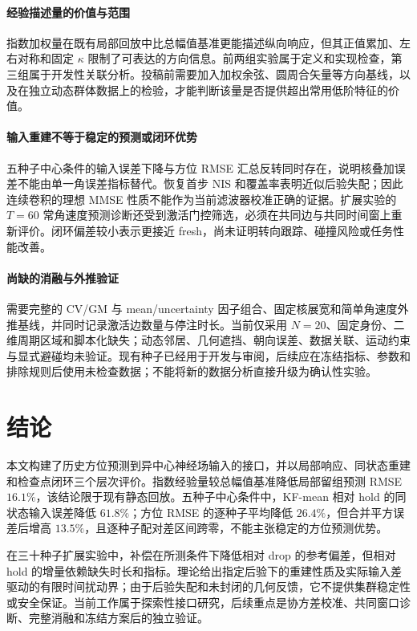 \documentclass[UTF8,fontset=windows,11pt]{ctexart}
\begin{document}
\paragraph{经验描述量的价值与范围}
指数加权量在既有局部回放中比总幅值基准更能描述纵向响应，但其正值累加、左右对称和固定 $\kappa$ 限制了可表达的方向信息。前两组实验属于定义和实现检查，第三组属于开发性关联分析。投稿前需要加入加权余弦、圆周合矢量等方向基线，以及在独立动态群体数据上的检验，才能判断该量是否提供超出常用低阶特征的价值。

\paragraph{输入重建不等于稳定的预测或闭环优势}
五种子中心条件的输入误差下降与方位 RMSE 汇总反转同时存在，说明核叠加误差不能由单一角误差指标替代。恢复首步 NIS 和覆盖率表明近似后验失配；因此连续卷积的理想 MMSE 性质不能作为当前滤波器校准正确的证据。扩展实验的 $T=60$ 常角速度预测诊断还受到激活门控筛选，必须在共同边与共同时间窗上重新评价。闭环偏差较小表示更接近 fresh，尚未证明转向跟踪、碰撞风险或任务性能改善。

\paragraph{尚缺的消融与外推验证}
需要完整的 CV/GM 与 mean/uncertainty 因子组合、固定核展宽和简单角速度外推基线，并同时记录激活边数量与停注时长。当前仅采用 $N=20$、固定身份、二维周期区域和脚本化缺失；动态邻居、几何遮挡、朝向误差、数据关联、运动约束与显式避碰均未验证。现有种子已经用于开发与审阅，后续应在冻结指标、参数和排除规则后使用未检查数据；不能将新的数据分析直接升级为确认性实验。

\section{结论}

本文构建了历史方位预测到异中心神经场输入的接口，并以局部响应、同状态重建和检查点闭环三个层次评价。指数经验量较总幅值基准降低局部留组预测 RMSE $16.1\%$，该结论限于现有静态回放。五种子中心条件中，KF-mean 相对 hold 的同状态输入误差降低 $61.8\%$；方位 RMSE 的逐种子平均降低 $26.4\%$，但合并平方误差后增高 $13.5\%$，且逐种子配对差区间跨零，不能主张稳定的方位预测优势。

在三十种子扩展实验中，补偿在所测条件下降低相对 drop 的参考偏差，但相对 hold 的增量依赖缺失时长和指标。理论给出指定后验下的重建性质及实际输入差驱动的有限时间扰动界；由于后验失配和未封闭的几何反馈，它不提供集群稳定性或安全保证。当前工作属于探索性接口研究，后续重点是协方差校准、共同窗口诊断、完整消融和冻结方案后的独立验证。
\end{document}
